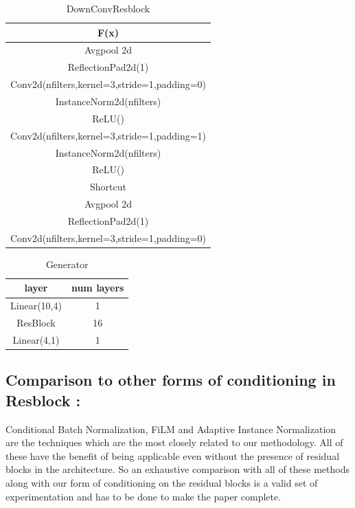 \documentclass[10pt,twocolumn,letterpaper]{article}
\begin{document}
\begin{table}[ht]
\caption{DownConvResblock} %
\centering %
\begin{tabular}{c} %
\hline\hline %
F(x)\\%
\hline
Avgpool 2d \\
ReflectionPad2d(1) \\
Conv2d(nfilters,kernel=3,stride=1,padding=0) \\
InstanceNorm2d(nfilters)\\ %
ReLU() \\
Conv2d(nfilters,kernel=3,stride=1,padding=1) \\
InstanceNorm2d(nfilters)\\ %
ReLU() \\
\hline %
Shortcut\\
\hline 
Avgpool 2d \\
ReflectionPad2d(1)\\
Conv2d(nfilters,kernel=3,stride=1,padding=0) \\
\hline
\end{tabular}
\label{table:downconvresblock} %
\end{table}


\begin{table}[ht]
\caption{Generator} %
\centering %
\begin{tabular}{c c} %
\hline\hline %
layer & num layers\\%
\hline %
Linear(10,4) & 1\\ %
ResBlock & 16 \\
Linear(4,1) & 1 \\
\hline %
\end{tabular}
\label{table:1d_G} %
\end{table}


\subsection{Comparison to other forms of conditioning in Resblock :}
Conditional Batch Normalization, FiLM and Adaptive Instance Normalization are the techniques which are the most closely related to our methodology. All of these have the benefit of being applicable even without the presence of residual blocks in the architecture. So an exhaustive comparison with all of these methods along with our form of conditioning on the residual blocks is a valid set of experimentation and has to be done to make the paper complete.
\end{document}
